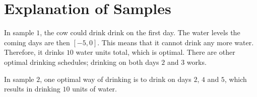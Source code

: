 \section*{Explanation of Samples}
In sample $1$, the cow could drink drink on the first day. The water levels the coming days are then
$[-5,0]$. This means that it cannot drink any more water. Therefore, it drinks $10$ water units total, which is optimal.
There are other optimal drinking schedules; drinking on both days $2$ and $3$ works.

In sample $2$, one optimal way of drinking is to drink on days $2$, $4$ and $5$, which results in drinking $10$ units of water.
